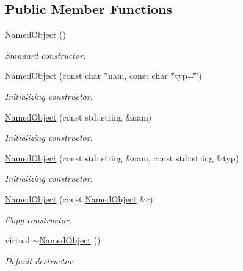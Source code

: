 \subsection*{Public Member Functions}
\begin{DoxyCompactItemize}
\item 
\hyperlink{class_d_d4hep_1_1_named_object_a210152aa261bc94e2012f6a0242faae0}{NamedObject} ()
\begin{DoxyCompactList}\small\item\em Standard constructor. \item\end{DoxyCompactList}\item 
\hyperlink{class_d_d4hep_1_1_named_object_a8d1a329816f1cd08f79dc3fd34bd705a}{NamedObject} (const char $\ast$nam, const char $\ast$typ=\char`\"{}\char`\"{})
\begin{DoxyCompactList}\small\item\em Initializing constructor. \item\end{DoxyCompactList}\item 
\hyperlink{class_d_d4hep_1_1_named_object_a5d287da6b18dfb39eda2bbac78dabfb3}{NamedObject} (const std::string \&nam)
\begin{DoxyCompactList}\small\item\em Initializing constructor. \item\end{DoxyCompactList}\item 
\hyperlink{class_d_d4hep_1_1_named_object_ade52cf9617e164e408df2ca3bc2f90f5}{NamedObject} (const std::string \&nam, const std::string \&typ)
\begin{DoxyCompactList}\small\item\em Initializing constructor. \item\end{DoxyCompactList}\item 
\hyperlink{class_d_d4hep_1_1_named_object_acf040390da871e998768cf0a9ea6fc98}{NamedObject} (const \hyperlink{class_d_d4hep_1_1_named_object}{NamedObject} \&c)
\begin{DoxyCompactList}\small\item\em Copy constructor. \item\end{DoxyCompactList}\item 
virtual \hyperlink{class_d_d4hep_1_1_named_object_ad13ddb19830d49ca540eb1491c40de03}{$\sim$NamedObject} ()
\begin{DoxyCompactList}\small\item\em Default destructor. \item\end{DoxyCompactList}\item 

\end{DoxyCompactItemize}
